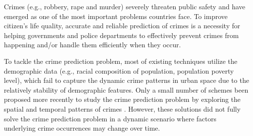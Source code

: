 Crimes (e.g., robbery, rape and murder) severely threaten public
safety and have emerged as one of the most important problems
countries face. To improve citizen’s life quality, accurate and reliable
prediction of crimes is a necessity for helping governments and
police departments to effectively prevent crimes from happening
and/or handle them efficiently when they occur.

\noindent To tackle the crime prediction problem, most of existing techniques utilize the demographic data (e.g., racial composition of
population, population poverty level)\cite{b1,p1,a1}, which fail to capture the dynamic crime patterns in urban space due to the relatively
stability of demographic features. Only a small number of schemes
been proposed more recently to study the crime prediction problem
by exploring the spatial and temporal patterns of crimes \cite{p2,p3}.
However, these solutions did not fully solve the crime prediction
problem in a dynamic scenario where factors underlying crime
occurrences may change over time.

